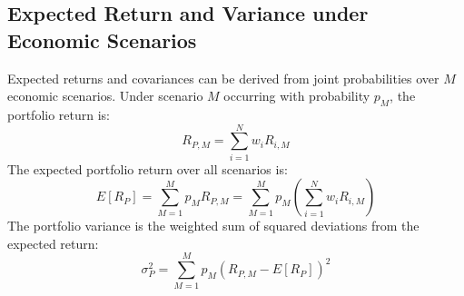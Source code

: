 \subsection{Expected Return and Variance under Economic Scenarios}
\label{subsec:Scenarios}
Expected returns and covariances can be derived from joint probabilities over $M$ economic scenarios. Under scenario $M$ occurring with probability $p_M$, the portfolio return is:
\begin{equation}
	R_{P,M} = \sum_{i=1}^N w_i R_{i,M}
	\label{eq:scenario_portfolio_return_m8}
\end{equation}
The expected portfolio return over all scenarios is:
\begin{equation}
	E[R_P] = \sum_{M=1}^M p_M R_{P,M} = \sum_{M=1}^M p_M \left( \sum_{i=1}^N w_i R_{i,M} \right)
	\label{eq:expected_return_scenarios_m8}
\end{equation}
The portfolio variance is the weighted sum of squared deviations from the expected return:
\begin{equation}
	\sigma_P^2 = \sum_{M=1}^M p_M \left( R_{P,M} - E[R_P] \right)^2
	\label{eq:variance_scenarios_m8}
\end{equation}
